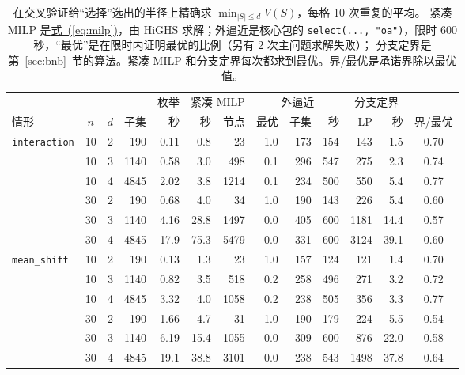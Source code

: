 \documentclass[11pt,a4paper,fontset=none]{ctexart}
\newcommand{\Eqref}[1]{\hyperref[#1]{式~(\ref*{#1})}}
\newcommand{\Secref}[1]{\hyperref[#1]{第~\ref*{#1}~节}}
\theoremstyle{definition}
\begin{document}
\begin{table}[htbp]
\centering\footnotesize
\setlength{\tabcolsep}{4pt}
\begin{tabular}{lcrrrrrrrrrrc}
\toprule
& & & & 枚举 & \multicolumn{2}{c}{紧凑 MILP} & \multicolumn{3}{c}{外逼近} & \multicolumn{2}{c}{分支定界} & \\
\cmidrule(lr){5-5}\cmidrule(lr){6-7}\cmidrule(lr){8-10}\cmidrule(lr){11-12}
情形 & $n$ & $d$ & 子集 & 秒 & 秒 & 节点 & 最优 & 子集 & 秒 & LP & 秒 & 界/最优\\
\midrule
\texttt{interaction} & 10 & 2 & 190 & 0.11 & 0.8 & 23 & 1.0 & 173 & 154 & 143 & 1.5 & 0.70\\
& 10 & 3 & 1140 & 0.58 & 3.0 & 498 & 0.1 & 296 & 547 & 275 & 2.3 & 0.74\\
& 10 & 4 & 4845 & 2.02 & 3.8 & 1214 & 0.1 & 234 & 500 & 550 & 5.4 & 0.77\\
& 30 & 2 & 190 & 0.68 & 4.0 & 34 & 1.0 & 190 & 143 & 226 & 5.4 & 0.60\\
& 30 & 3 & 1140 & 4.16 & 28.8 & 1497 & 0.0 & 405 & 600 & 1181 & 14.4 & 0.57\\
& 30 & 4 & 4845 & 17.9 & 75.3 & 5479 & 0.0 & 331 & 600 & 3124 & 39.1 & 0.60\\
\texttt{mean\_shift} & 10 & 2 & 190 & 0.13 & 1.3 & 23 & 1.0 & 157 & 124 & 121 & 1.4 & 0.70\\
& 10 & 3 & 1140 & 0.82 & 3.5 & 518 & 0.2 & 258 & 496 & 271 & 3.2 & 0.72\\
& 10 & 4 & 4845 & 3.32 & 4.0 & 1058 & 0.2 & 238 & 505 & 356 & 3.3 & 0.77\\
& 30 & 2 & 190 & 1.66 & 4.7 & 31 & 1.0 & 190 & 179 & 224 & 5.5 & 0.54\\
& 30 & 3 & 1140 & 6.19 & 15.4 & 1055 & 0.0 & 309 & 600 & 876 & 22.0 & 0.58\\
& 30 & 4 & 4845 & 19.1 & 38.8 & 3101 & 0.0 & 238 & 543 & 1498 & 37.8 & 0.64\\
\bottomrule
\end{tabular}
\caption{在交叉验证给“选择”选出的半径上精确求 $\min_{|S|\le d}V(S)$，每格 10 次重复的平均。
紧凑 MILP 是\Eqref{eq:milp}，由 HiGHS 求解；外逼近是核心包的 \texttt{select(..., "oa")}，限时 600 秒，“最优”是在限时内证明最优的比例（另有 2 次主问题求解失败）；
分支定界是\Secref{sec:bnb}的算法。紧凑 MILP 和分支定界每次都求到最优。界/最优是承诺界除以最优值。}
\label{tab:computation}
\end{table}
\end{document}

